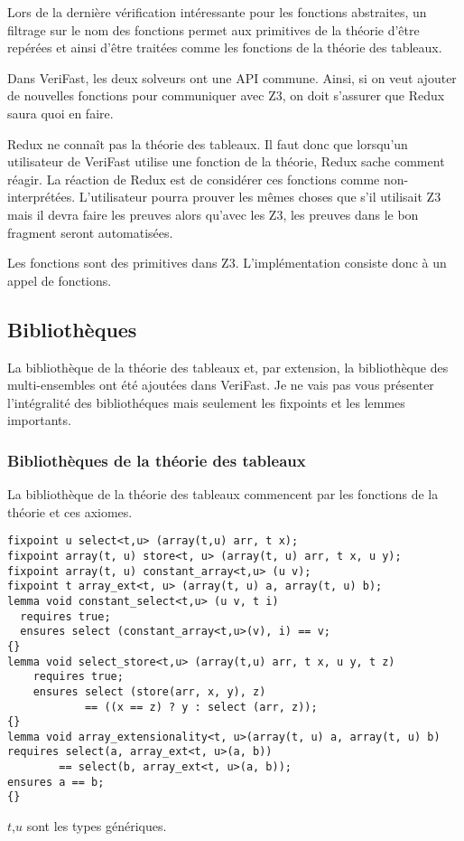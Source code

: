 \documentclass[11pt,openany]{article}
\newcommand{\verifast}{VeriFast}
\begin{document}
		Lors de la derni\`ere v\'erification int\'eressante pour les fonctions abstraites, un filtrage sur le nom des fonctions permet aux primitives de la th\'eorie d'\^etre rep\'er\'ees et ainsi d'\^etre trait\'ees comme les fonctions de la th\'eorie des tableaux.
		
		Dans \verifast{}, les deux solveurs ont une API commune. Ainsi, si on veut ajouter de nouvelles fonctions pour communiquer avec Z3, on doit s'assurer que Redux saura quoi en faire.
		
			Redux ne conna\^it pas la th\'eorie des tableaux. Il faut donc que lorsqu'un utilisateur de \verifast{} utilise une fonction de la th\'eorie, Redux sache comment r\'eagir. La r\'eaction de Redux est de consid\'erer ces fonctions comme non-interpr\'et\'ees. L'utilisateur pourra prouver les m\^emes choses que s'il utilisait Z3 mais il devra faire les preuves alors qu'avec les Z3, les preuves dans le bon fragment seront automatis\'ees.
			
			Les fonctions sont des primitives dans Z3. L'impl\'ementation consiste donc \`a un appel de fonctions.
			
	
	\subsection{Biblioth\`eques}
		La biblioth\`eque de la th\'eorie des tableaux et, par extension, la biblioth\`eque des multi-ensembles ont \'et\'e ajout\'ees dans \verifast. Je ne vais pas vous pr\'esenter l'int\'egralit\'e des biblioth\'eques mais seulement les fixpoints et les lemmes importants.
		\subsubsection{Biblioth\`eques de la th\'eorie des tableaux}
			La biblioth\`eque de la th\'eorie des tableaux commencent par les fonctions de la th\'eorie et ces axiomes.
			\begin{lstlisting}
fixpoint u select<t,u> (array(t,u) arr, t x);
fixpoint array(t, u) store<t, u> (array(t, u) arr, t x, u y);
fixpoint array(t, u) constant_array<t,u> (u v);
fixpoint t array_ext<t, u> (array(t, u) a, array(t, u) b);
lemma void constant_select<t,u> (u v, t i)
  requires true;
  ensures select (constant_array<t,u>(v), i) == v;
{}
lemma void select_store<t,u> (array(t,u) arr, t x, u y, t z)
    requires true;
    ensures select (store(arr, x, y), z) 
    		== ((x == z) ? y : select (arr, z));
{}
lemma void array_extensionality<t, u>(array(t, u) a, array(t, u) b)
requires select(a, array_ext<t, u>(a, b)) 
		== select(b, array_ext<t, u>(a, b));
ensures a == b;
{}
			\end{lstlisting}
			$t$,$u$ sont les types g\'en\'eriques.
			
\end{document}
